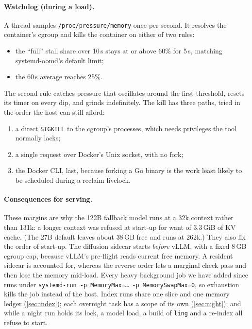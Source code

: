 \documentclass[11pt]{article}
\newcommand{\code}[1]{\texttt{#1}}
\begin{document}
\paragraph{Watchdog (during a load).} A thread samples \code{/proc/pressure/memory} once per second.
It resolves the container's cgroup and kills the container on either of two rules:
\begin{itemize}
  \item the ``full'' stall share over 10\,s stays at or above 60\% for 5\,s, matching systemd-oomd's
    default limit;
  \item the 60\,s average reaches 25\%.
\end{itemize}
The second rule catches pressure that oscillates around the first threshold, resets its timer on
every dip, and grinds indefinitely. The kill has three paths, tried in the order the host can still
afford:
\begin{enumerate}
  \item a direct \code{SIGKILL} to the cgroup's processes, which needs privileges the tool normally
    lacks;
  \item a single request over Docker's Unix socket, with no fork;
  \item the Docker CLI, last, because forking a Go binary is the work least likely to be scheduled
    during a reclaim livelock.
\end{enumerate}

\paragraph{Consequences for serving.} These margins are why the 122B fallback model runs at a 32k
context rather than 131k: a longer context was refused at start-up for want of 3.3\,GiB of KV
cache. (The 27B default leaves about 38\,GB free and runs at 262k.) They also
fix the order of start-up. The diffusion sidecar starts \emph{before} vLLM, with a fixed 8\,GB
cgroup cap, because vLLM's pre-flight reads current free memory. A resident sidecar is accounted
for, whereas the reverse order lets a marginal check pass and then lose the memory mid-load.
Every heavy background job we have added since runs under
\code{systemd-run -p MemoryMax=\ldots{} -p MemorySwapMax=0}, so exhaustion kills the job instead
of the host. Index runs share one slice and one memory ledger (\cref{sec:index}); each overnight
task has a scope of its own (\cref{sec:night}); and while a night run holds its lock, a model
load, a build of \code{ling} and a re-index all refuse to start.
\end{document}
